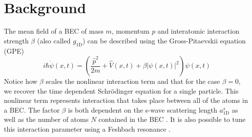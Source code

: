 \documentclass[a4paper, twocolumn]{revtex4-1}
\begin{document}
\section{Background} \label{sec:back}
The mean field of a BEC of mass $m$, momentum $p$ and interatomic interaction strength $\beta$ (also called $g_{\text{1D}}$) can be described using the Gross-Pitaevskii equation (GPE)
\begin{equation}
	i\hbar \dot{\psi}(x,t)= \left( \frac{\hat{p}^2}{2m} + \hat{V}(x,t) + \beta |\psi(x,t)|^2 \right)\psi(x,t)
	\label{eq:Hbec}
\end{equation}
Notice how $\beta$ scales the nonlinear interaction term and that for the case $\beta=0$, we recover the time dependent Schrödinger equation for a single particle. This nonlinear term represents interaction that takes place between all of the atoms in a BEC. The factor $\beta$ is both dependent on the s-wave scattering length $a_{\text{1D}}^s$ as well as the number of atoms  $N$ contained in the BEC \cite{Schmiedmayer}. It is also possible to tune this interaction parameter using a Feshbach resonance \cite{Feshbach}. \\ 
\end{document}
